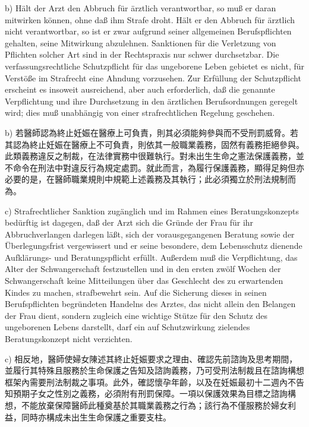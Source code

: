 \documentclass[12pt]{article}
\begin{document}
\begin{sourcepara}[title={原文D.143}]
b) Hält der Arzt den Abbruch für ärztlich verantwortbar, so muß er daran mitwirken können, ohne daß ihm Strafe droht. Hält er den Abbruch für ärztlich nicht verantwortbar, so ist er zwar aufgrund seiner allgemeinen Berufspflichten gehalten, seine Mitwirkung abzulehnen. Sanktionen für die Verletzung von Pflichten solcher Art sind in der Rechtspraxis nur schwer durchsetzbar. Die verfassungsrechtliche Schutzpflicht für das ungeborene Leben gebietet es nicht, für Verstöße im Strafrecht eine Ahndung vorzusehen. Zur Erfüllung der Schutzpflicht erscheint es insoweit ausreichend, aber auch erforderlich, daß die genannte Verpflichtung und ihre Durchsetzung in den ärztlichen Berufsordnungen geregelt wird; dies muß unabhängig von einer strafrechtlichen Regelung geschehen.
\end{sourcepara}
\begin{transpara}
b) 若醫師認為終止妊娠在醫療上可負責，則其必須能夠參與而不受刑罰威脅。若其認為終止妊娠在醫療上不可負責，則依其一般職業義務，固然有義務拒絕參與。此類義務違反之制裁，在法律實務中很難執行。對未出生生命之憲法保護義務，並不命令在刑法中對違反行為規定處罰。就此而言，為履行保護義務，顯得足夠但亦必要的是，在醫師職業規則中規範上述義務及其執行；此必須獨立於刑法規制而為。
\end{transpara}

\begin{sourcepara}[title={原文D.144}]
c) Strafrechtlicher Sanktion zugänglich und im Rahmen eines Beratungskonzepts bedürftig ist dagegen, daß der Arzt sich die Gründe der Frau für ihr Abbruchverlangen darlegen läßt, sich der vorausgegangenen Beratung sowie der Überlegungsfrist vergewissert und er seine besondere, dem Lebensschutz dienende Aufklärungs- und Beratungspflicht erfüllt. Außerdem muß die Verpflichtung, das Alter der Schwangerschaft festzustellen und in den ersten zwölf Wochen der Schwangerschaft keine Mitteilungen über das Geschlecht des zu erwartenden Kindes zu machen, strafbewehrt sein. Auf die Sicherung dieses in seinen Berufspflichten begründeten Handelns des Arztes, das nicht allein den Belangen der Frau dient, sondern zugleich eine wichtige Stütze für den Schutz des ungeborenen Lebens darstellt, darf ein auf Schutzwirkung zielendes Beratungskonzept nicht verzichten.
\end{sourcepara}
\begin{transpara}
c) 相反地，醫師使婦女陳述其終止妊娠要求之理由、確認先前諮詢及思考期間，並履行其特殊且服務於生命保護之告知及諮詢義務，乃可受刑法制裁且在諮詢構想框架內需要刑法制裁之事項。此外，確認懷孕年齡，以及在妊娠最初十二週內不告知預期子女之性別之義務，必須附有刑罰保障。一項以保護效果為目標之諮詢構想，不能放棄保障醫師此種奠基於其職業義務之行為；該行為不僅服務於婦女利益，同時亦構成未出生生命保護之重要支柱。
\end{transpara}
\end{document}
